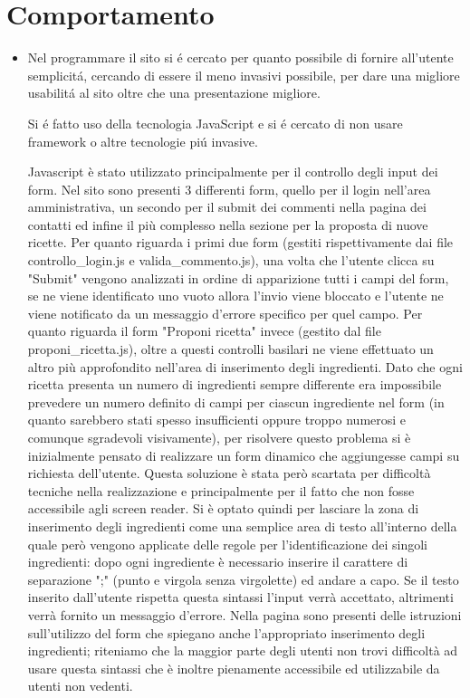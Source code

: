 \documentclass[12pt]{article}
\begin{document}
			\section{Comportamento}
			\begin{itemize}
				\item Nel programmare il sito si \'e cercato per quanto possibile di fornire all'utente semplicit\'a, cercando di essere il meno invasivi possibile, per dare una migliore usabilit\'a al sito oltre che una presentazione migliore.
				
				Si \'e fatto uso della tecnologia JavaScript e si \'e cercato di non usare framework o altre tecnologie pi\'u invasive.
				
				Javascript è stato utilizzato principalmente per il controllo degli input dei form. Nel sito sono presenti 3 differenti form, quello per il login nell'area amministrativa, un secondo per il submit dei commenti nella pagina dei contatti ed infine il più complesso nella sezione per la proposta di nuove ricette.
				Per quanto riguarda i primi due form (gestiti rispettivamente dai file controllo_login.js e valida_commento.js), una volta che l'utente clicca su "Submit" vengono analizzati in ordine di apparizione tutti i campi del form, se ne viene identificato uno vuoto allora l'invio viene bloccato e l'utente ne viene notificato da un messaggio d'errore specifico per quel campo.
				Per quanto riguarda il form "Proponi ricetta" invece (gestito dal file proponi_ricetta.js), oltre a questi controlli basilari ne viene effettuato un altro più approfondito nell'area di inserimento degli ingredienti. Dato che ogni ricetta presenta un numero di ingredienti sempre differente era impossibile prevedere un numero definito di campi per ciascun ingrediente nel form (in quanto sarebbero stati spesso insufficienti oppure troppo numerosi e comunque sgradevoli visivamente), per risolvere questo problema si è inizialmente pensato di realizzare un form dinamico che aggiungesse campi su richiesta dell'utente. Questa soluzione è stata però scartata per difficoltà tecniche nella realizzazione e principalmente per il fatto che non fosse accessibile agli screen reader. Si è optato quindi per lasciare la zona di inserimento degli ingredienti come una semplice area di testo all'interno della quale però vengono applicate delle regole per l'identificazione dei singoli ingredienti: dopo ogni ingrediente è necessario inserire il carattere di separazione ";" (punto e virgola senza virgolette) ed andare a capo. Se il testo inserito dall'utente rispetta questa sintassi l'input verrà accettato, altrimenti verrà fornito un messaggio d'errore. Nella pagina sono presenti delle istruzioni sull'utilizzo del form che spiegano anche l'appropriato inserimento degli ingredienti; riteniamo che la maggior parte degli utenti non trovi difficoltà ad usare questa sintassi che è inoltre pienamente accessibile ed utilizzabile da utenti non vedenti.
				

\end{itemize}
\end{document}
